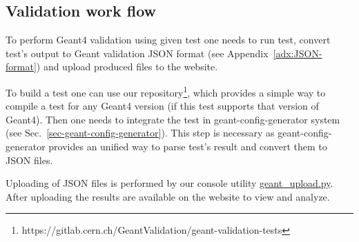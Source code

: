 
%

\subsection{Validation work flow}
\label{sec-workflow}

To perform Geant4 validation using given test one needs to run test, convert test's output to Geant validation JSON format (see Appendix~\ref{adx:JSON-format}) and upload produced files to the website.

To build a test one can use our  repository\footnote{https://gitlab.cern.ch/GeantValidation/geant-validation-tests}, which provides a simple way to compile a test for any Geant4 version (if this test supports that version of Geant4).
Then one needs to integrate the test in geant-config-generator system (see Sec.~\ref{sec-geant-config-generator}). This step is necessary as geant-config-generator provides an unified way to parse test's result and convert them to JSON files. 

Uploading of JSON files is performed by our console utility
\href{https://gitlab.cern.ch/GeantValidation/GVP/raw/master/scripts/geant_upload.py}{geant\_upload.py}.
After uploading the results are available on the website to view and analyze.




